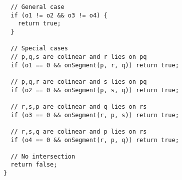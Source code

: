 \documentclass{article}
\begin{document}
\begin{lstlisting}
  // General case
  if (o1 != o2 && o3 != o4) {
    return true;
  }

  // Special cases
  // p,q,s are colinear and r lies on pq
  if (o1 == 0 && onSegment(p, r, q)) return true;

  // p,q,r are colinear and s lies on pq
  if (o2 == 0 && onSegment(p, s, q)) return true;

  // r,s,p are colinear and q lies on rs
  if (o3 == 0 && onSegment(r, p, s)) return true;

  // r,s,q are colinear and p lies on rs
  if (o4 == 0 && onSegment(r, p, q)) return true;

  // No intersection
  return false;
}
\end{lstlisting}
\end{document}
